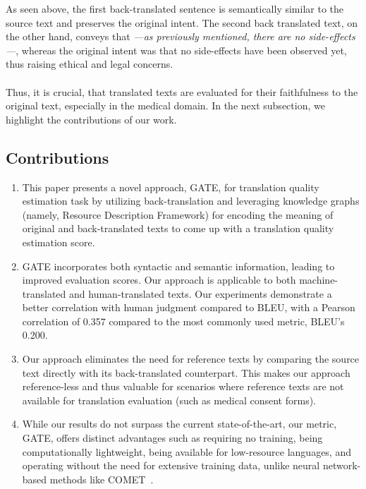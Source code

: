 \documentclass[runningheads]{llncs}
\begin{document}
As seen above, the first back-translated sentence is semantically similar to the source text and preserves the original intent. The second back translated text, on the other hand, conveys that \textit{---as previously mentioned, there are no side-effects---}, whereas the original intent was that no side-effects have been observed yet, thus raising ethical and legal concerns. 

\paragraph{} Thus, it is crucial, that translated texts are evaluated for their faithfulness to the original text, especially in the medical domain. In the next subsection, we highlight the contributions of our work. 

\subsection{Contributions}\label{contri}

\begin{enumerate}
  \item This paper presents a novel approach, GATE, for translation quality estimation task by utilizing back-translation and leveraging knowledge graphs (namely, Resource Description Framework) for encoding the meaning of original and back-translated texts to come up with a translation quality estimation score.
  \item GATE incorporates both syntactic and semantic information, leading to improved evaluation scores. Our approach is applicable to both machine-translated and human-translated texts. Our experiments demonstrate a better correlation with human judgment compared to BLEU, with a Pearson correlation of 0.357 compared to the most commonly used metric, BLEU’s 0.200.
  \item Our approach eliminates the need for reference texts by comparing the source text directly with its back-translated counterpart. This makes our approach reference-less and thus valuable for scenarios where reference texts are not available for translation evaluation (such as medical consent forms).   
  \item While our results do not surpass the current state-of-the-art, our metric, GATE, offers distinct advantages such as requiring no training, being computationally lightweight, being available for low-resource languages, and operating without the need for extensive training data, unlike neural network-based methods like COMET~\cite{comet}.
\end{enumerate}
\end{document}
